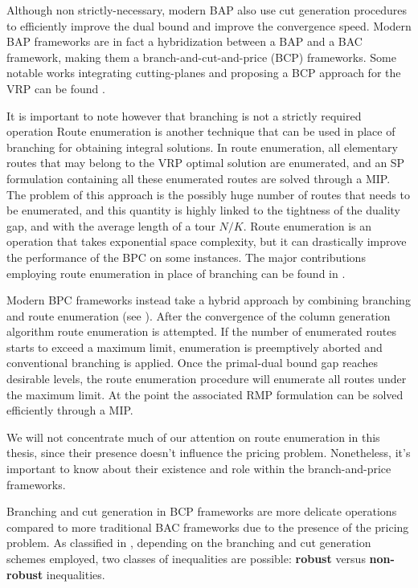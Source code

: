 Although non strictly-necessary, modern BAP also use
cut generation procedures to efficiently improve the dual bound and improve the convergence speed.
Modern BAP frameworks
are in fact a hybridization between a BAP and a BAC framework,
making them a branch-and-cut-and-price (BCP) frameworks.
Some notable works integrating cutting-planes and proposing
a BCP approach for the VRP can be found \textcite{fukasawa2006, ropke2012}.

\medskip

It is important to note however that branching is not a strictly required operation
Route enumeration is another technique that can be used in place of branching
for obtaining integral solutions.
In route enumeration, all elementary routes that may belong to the VRP optimal solution are enumerated,
and an SP formulation containing all these enumerated routes are solved through a MIP.
The problem of this approach is the possibly huge number of routes that needs to be enumerated,
and this quantity is highly linked to the tightness of the duality gap,
and with the average length of a tour $N / K$.
Route enumeration is an operation that takes exponential space complexity,
but it can drastically improve the performance of the BPC on some instances.
The major contributions employing route enumeration in place of branching can be found in
\textcite{baldacci2008, baldacci2011, contardo2014}.

Modern BPC frameworks instead take a hybrid approach by combining branching and route enumeration
(see \cite{pessoa2008a, pessoa2009, pecin2017, pessoa2020}).
After the convergence of the column generation algorithm route enumeration is attempted.
If the number of enumerated routes starts to exceed a maximum limit, enumeration
is preemptively aborted and conventional branching is applied.
Once the primal-dual bound gap reaches desirable levels, the route enumeration
procedure will enumerate all routes under the maximum limit.
At the point the associated RMP formulation can be solved efficiently through a MIP.

We will not concentrate much of our attention on route enumeration in this
thesis, since their presence doesn't influence the pricing problem.
Nonetheless, it's important to know about their existence and role within
the branch-and-price frameworks.

\medskip

Branching and cut generation in BCP frameworks are more delicate operations
compared to more traditional BAC frameworks due to the presence of the pricing problem.
As classified in \textcite{dearagao2003},
depending on the branching and cut generation schemes employed,
two classes of inequalities are possible:
\textbf{robust} versus \textbf{non-robust} inequalities.

